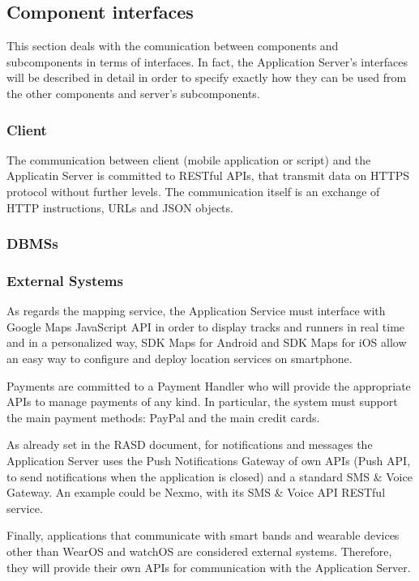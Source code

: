 \subsection{Component interfaces}
This section deals with the comunication between components and subcomponents in terms of interfaces. In fact, the Application Server's interfaces will be described in detail in order to specify exactly how they can be used from the other components and server's subcomponents.

\subsubsection{Client}
The communication between client (mobile application or script) and the Applicatin Server is committed to RESTful APIs, that transmit data on HTTPS protocol without further levels. The communication itself is an exchange of HTTP instructions, URLs and JSON objects.

\subsubsection{DBMSs}

\subsubsection{External Systems}
As regards the mapping service, the Application Service must interface with Google Maps JavaScript API in order to display tracks and runners in real time and in a personalized way, SDK Maps for Android and SDK Maps for iOS allow an easy way to configure and deploy location services on smartphone.

Payments are committed to a Payment Handler who will provide the appropriate APIs to manage payments of any kind. In particular, the system must support the main payment methods: PayPal and the main credit cards.

As already set in the RASD document, for notifications and messages the Application Server uses the Push Notifications Gateway of own APIs (Push API, to send notifications when the application is closed) and a standard SMS \& Voice Gateway. 
An example could be Nexmo, with its SMS \& Voice API RESTful service.

Finally, applications that communicate with smart bands and wearable devices other than WearOS and watchOS are considered external systems. Therefore, they will provide their own APIs for communication with the Application Server.

